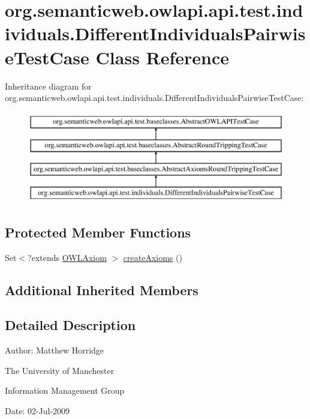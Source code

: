\hypertarget{classorg_1_1semanticweb_1_1owlapi_1_1api_1_1test_1_1individuals_1_1_different_individuals_pairwise_test_case}{\section{org.\-semanticweb.\-owlapi.\-api.\-test.\-individuals.\-Different\-Individuals\-Pairwise\-Test\-Case Class Reference}
\label{classorg_1_1semanticweb_1_1owlapi_1_1api_1_1test_1_1individuals_1_1_different_individuals_pairwise_test_case}
}
Inheritance diagram for org.\-semanticweb.\-owlapi.\-api.\-test.\-individuals.\-Different\-Individuals\-Pairwise\-Test\-Case\-:\begin{figure}[H]
\begin{center}
\leavevmode
\includegraphics[height=4.000000cm]{classorg_1_1semanticweb_1_1owlapi_1_1api_1_1test_1_1individuals_1_1_different_individuals_pairwise_test_case}
\end{center}
\end{figure}
\subsection*{Protected Member Functions}
\begin{DoxyCompactItemize}
\item 
Set$<$?extends \hyperlink{interfaceorg_1_1semanticweb_1_1owlapi_1_1model_1_1_o_w_l_axiom}{O\-W\-L\-Axiom} $>$ \hyperlink{classorg_1_1semanticweb_1_1owlapi_1_1api_1_1test_1_1individuals_1_1_different_individuals_pairwise_test_case_a2305f011d43a9d5f1a4833734e3c6ddf}{create\-Axioms} ()
\end{DoxyCompactItemize}
\subsection*{Additional Inherited Members}


\subsection{Detailed Description}
Author\-: Matthew Horridge\par
 The University of Manchester\par
 Information Management Group\par
 Date\-: 02-\/\-Jul-\/2009 

